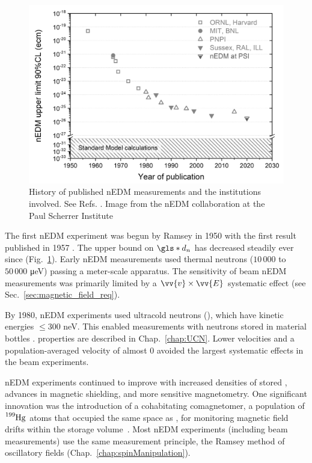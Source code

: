 \begin{figure}[htp]
    \centering
    \includegraphics[width=0.75 \textwidth]{figures/nEDM-history.jpg}
    \caption[History of published nEDM measurements and the institutions involved.]{History of published nEDM measurements and the institutions involved. See Refs. \cite{ramsey_nedm_1950, ramsey_nedm_1957, miller_nedm_1967, baird_nedm_1969, cohen_nedm_1969, dress_nedm_1977, altarev_nedm_1980, altarev_nedm_1981, smith_nedm_1990, BAK06, ABE20}. Image from the nEDM collaboration at the Paul Scherrer Institute}
    \label{fig:nEDM-history}
\end{figure}

The first nEDM experiment was begun by Ramsey in 1950 with the first result published in 1957 \cite{ramsey_nedm_1950, ramsey_nedm_1957}. The upper bound on $\gls*{d_n}$ has decreased steadily ever since (Fig.~\ref{fig:nEDM-history}). Early nEDM measurements \cite{miller_nedm_1967, baird_nedm_1969, cohen_nedm_1969, dress_nedm_1977} used thermal neutrons ($10\,000$ to $50\,000$ \unit{\micro \eV}) passing a meter-scale apparatus. The sensitivity of beam nEDM measurements was primarily limited by a $\vv{v}\times\vv{E}$ systematic effect (see Sec.~\ref{sec:magnetic_field_req}).

By 1980, nEDM experiments \cite{altarev_nedm_1980, altarev_nedm_1981} used ultracold neutrons (\ucn), which have kinetic energies $\leq 300$ neV. This enabled measurements with neutrons stored in material bottles \cite{smith_nedm_1990}. \ucn properties are described in Chap.~\ref{chap:UCN}. Lower \ucn velocities and a population-averaged velocity of almost 0 avoided the largest systematic effects in the beam experiments. 

nEDM experiments continued to improve with increased densities of stored \ucn, advances in magnetic shielding, and more sensitive magnetometry. One significant innovation was the introduction of a cohabitating comagnetomer, a population of $\ce{^{199}Hg}$ atoms that occupied the same space as \ucn, for monitoring magnetic field drifts within the storage volume~\cite{BAK06}. Most nEDM experiments (including beam measurements) use the same measurement principle, the Ramsey method of oscillatory fields \cite{ramsey_molecular_1950} (Chap.~\ref{chap:spinManipulation}). 

